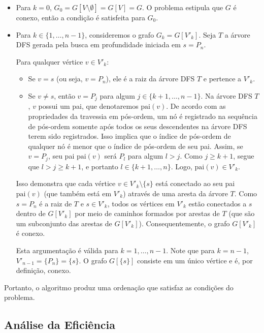 \documentclass[11pt,reqno,a4paper]{amsart}
\theoremstyle{prova_style}
\begin{document}
\begin{itemize}
    \item Para $k=0$, $G_0 = G[V \setminus \emptyset] = G[V] = G$. O problema estipula que $G$ é conexo, então a condição é satisfeita para $G_0$.
    \item Para $k \in \{1, \dots, n-1\}$, consideremos o grafo $G_k = G[V'_k]$. Seja $T$ a árvore DFS gerada pela busca em profundidade iniciada em $s=P_n$.
    
    Para qualquer vértice $v \in V'_k$:
    \begin{itemize}
        \item Se $v=s$ (ou seja, $v=P_n$), ele é a raiz da árvore DFS $T$ e pertence a $V'_k$. 
        \item Se $v \neq s$, então $v = P_j$ para algum $j \in \{k+1, \dots, n-1\}$. Na árvore DFS $T$, $v$ possui um pai, que denotaremos $\text{pai}(v)$. De acordo com as propriedades da travessia em pós-ordem, um nó é registrado na sequência de pós-ordem somente após todos os seus descendentes na árvore DFS terem sido registrados. Isso implica que o índice de pós-ordem de qualquer nó é menor que o índice de pós-ordem de seu pai. Assim, se $v = P_j$, seu pai $\text{pai}(v)$ será $P_l$ para algum $l > j$. Como $j \ge k+1$, segue que $l > j \ge k+1$, e portanto $l \in \{k+1, \dots, n\}$. Logo, $\text{pai}(v) \in V'_k$.
    \end{itemize}
    Isso demonstra que cada vértice $v \in V'_k \setminus \{s\}$ está conectado ao seu pai $\text{pai}(v)$ (que também está em $V'_k$) através de uma aresta da árvore $T$. Como $s=P_n$ é a raiz de $T$ e $s \in V'_k$, todos os vértices em $V'_k$ estão conectados a $s$ dentro de $G[V'_k]$ por meio de caminhos formados por arestas de $T$ (que são um subconjunto das arestas de $G[V'_k]$). Consequentemente, o grafo $G[V'_k]$ é conexo.
    
    Esta argumentação é válida para $k=1, \dots, n-1$. Note que para $k=n-1$, $V'_{n-1} = \{P_n\} = \{s\}$. O grafo $G[\{s\}]$ consiste em um único vértice e é, por definição, conexo.
\end{itemize}
Portanto, o algoritmo produz uma ordenação que satisfaz as condições do problema.

\subsection{Análise da Eficiência}
\end{document}
